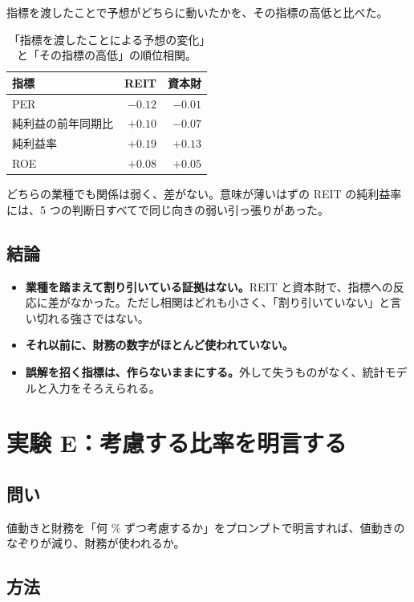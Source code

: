 \documentclass[xelatex,ja=standard,jafont=hiragino-pron,a4paper,10pt]{bxjsreport}
\begin{document}
指標を渡したことで予想がどちらに動いたかを、その指標の高低と比べた。

\begin{table}[htbp]
\centering
\caption{「指標を渡したことによる予想の変化」と「その指標の高低」の順位相関。}
\small
\begin{tabular}{lrr}
\toprule
指標 & REIT & 資本財 \\
\midrule
PER & $-0.12$ & $-0.01$ \\
純利益の前年同期比 & $+0.10$ & $-0.07$ \\
純利益率 & $+0.19$ & $+0.13$ \\
ROE & $+0.08$ & $+0.05$ \\
\bottomrule
\end{tabular}
\end{table}

どちらの業種でも関係は弱く、差がない。意味が薄いはずの REIT の純利益率には、5 つの判断日すべてで同じ向きの弱い引っ張りがあった。

\section{結論}

\begin{itemize}
\item \textbf{業種を踏まえて割り引いている証拠はない。}REIT と資本財で、指標への反応に差がなかった。ただし相関はどれも小さく、「割り引いていない」と言い切れる強さではない。
\item \textbf{それ以前に、財務の数字がほとんど使われていない。}
\item \textbf{誤解を招く指標は、作らないままにする。}外して失うものがなく、統計モデルと入力をそろえられる。
\end{itemize}

\chapter{実験 E：考慮する比率を明言する}\label{ch:expE}

\section{問い}

値動きと財務を「何 \% ずつ考慮するか」をプロンプトで明言すれば、値動きのなぞりが減り、財務が使われるか。

\section{方法}
\end{document}

